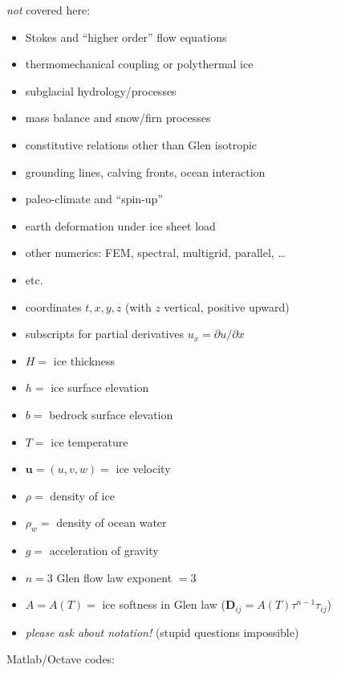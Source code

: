 \documentclass[titlepage,letterpaper,final,11pt]{scrartcl}
\newcommand{\alert}[1]{\emph{#1}}
\begin{document}
\emph{not} \normalsize covered here:

  \begin{itemize}
  \item Stokes and ``higher order'' flow equations
  \item thermomechanical coupling or polythermal ice
  \item subglacial hydrology/processes
  \item mass balance and snow/firn processes
  \item constitutive relations other than Glen isotropic
  \item grounding lines, calving fronts, ocean interaction
  \item paleo-climate and ``spin-up''
  \item earth deformation under ice sheet load
  \item other numerics: FEM, spectral, multigrid, parallel, \dots
  \item etc.
  \end{itemize}

  \begin{itemize}
  \item coordinates $t,x,y,z$  (with $z$ vertical, positive upward)
  \item subscripts for partial derivatives $u_x = \partial u/\partial x$
  \item $H=$ ice thickness
  \item $h=$ ice surface elevation
  \item $b=$ bedrock surface elevation
  \item $T=$ ice temperature
  \item $\mathbf{u}=(u,v,w)=$ ice velocity
  \item $\rho=$ density of ice
  \item $\rho_w=$ density of ocean water
  \item $g=$ acceleration of gravity
  \item $n=3$ Glen flow law exponent $=3$
  \item $A=A(T)=$ ice softness in Glen law ($\mathbf{D}_{ij} = A(T) \tau^{n-1} \tau_{ij}$)
  \item \alert{please ask about notation!}  (stupid questions impossible)
  \end{itemize}

\nocite{BLKCB,BBssasliding,Fowler,GreveBlatter2009,SchoofStream,SchoofMarine1}

Matlab/Octave codes:
\end{document}
